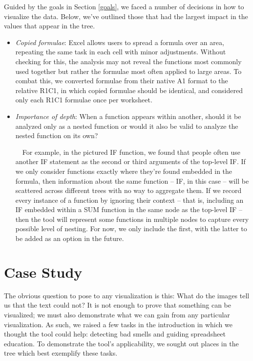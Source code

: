 \documentclass[conference]{IEEEtran}
\begin{document}
	Guided by the goals in Section \ref{goals}, we faced a number of decisions in
	how to visualize the data. Below, we've outlined those that had the largest
	impact in the values that appear in the tree. \begin{itemize}
		
		\item \textit{Copied formulae}: Excel allows users to spread a formula over an
		area, repeating the same task in each cell with minor adjustments. Without
		checking for this, the analysis may not reveal the functions most commonly
		used together but rather the formulae most often applied to large areas. To
		combat this, we converted formulae from their native A1 format to the relative
		R1C1, in which copied formulae should be identical, and considered only each
		R1C1 formulae once per worksheet.
		
		\item \textit{Importance of depth}: When a function appears within another,
		should it be analyzed only as a nested function or would it also be valid to
		analyze the nested function on its own? \par
		
		\ \ For example, in the pictured IF function, we found that people often use
		another IF statement as the second or third arguments of the top-level IF. If
		we only consider functions exactly where they're found embedded in the
		formula, then information about the same function -- IF, in this case -- will
		be scattered across different trees with no way to aggregate them. If we
		record every instance of a function by ignoring their context -- that is,
		including an IF embedded within a SUM function in the same node as the
		top-level IF -- then the tool will represent some functions in multiple nodes
		to capture every possible level of nesting. For now, we only include the
		first, with the latter to be added as an option in the future.
		
	\end{itemize}
	
	\section{Case Study} The obvious question to pose to any visualization is this:
	What do the images tell us that the text could not? It is not enough to prove
	that something can be visualized; we must also demonstrate what we can gain
	from any particular visualization. As such, we raised a few tasks in the
	introduction in which we thought the tool could help: detecting bad smells and
	guiding spreadsheet education. To demonstrate the tool's applicability, we
	sought out places in the tree which best exemplify these tasks.
	
\end{document}
